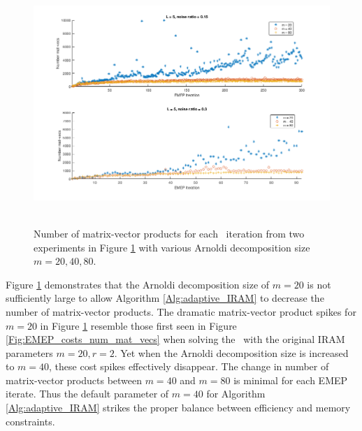 \begin{figure}[H]
\centering
\hbox{\hspace{-1.6cm} \includegraphics[scale=0.6]{Numerics-num_matvecs_ada_for_m_vals} }\vspace{0.0cm}
	\caption{Number of matrix-vector products for each \emep \ iteration from two experiments in Figure \ref{Fig:Numerics-num_matvecs_ada_for_m_vals} with various Arnoldi decomposition size $m=20, 40, 80$.}
\label{Fig:Numerics-num_matvecs_ada_for_m_vals}
\end{figure}




Figure \ref{Fig:Numerics-num_matvecs_ada_for_m_vals} demonstrates that the Arnoldi decomposition size of $m=20$ is not sufficiently large to allow Algorithm \ref{Alg:adaptive_IRAM} to decrease the number of matrix-vector products.  
The dramatic matrix-vector product spikes for $m=20$ in Figure \ref{Fig:Numerics-num_matvecs_ada_for_m_vals} resemble those first seen in Figure \ref{Fig:EMEP_costs_num_mat_vecs} when solving the \emep \ with the original IRAM parameters $m=20, r=2$.
Yet when the Arnoldi decomposition size is increased to $m=40$, these cost spikes effectively disappear.
The change in number of matrix-vector products between $m=40$ and $m=80$ is minimal for each EMEP iterate.  
Thus the default parameter of $m=40$ for Algorithm \ref{Alg:adaptive_IRAM} strikes the proper balance between efficiency and memory constraints.












